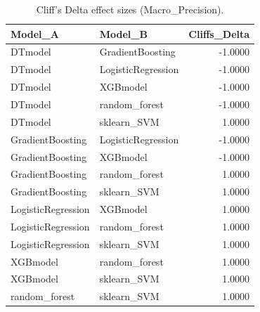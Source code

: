 \begin{table}[t]
\centering
\begin{tabular}{llr}
\toprule
Model_A & Model_B & Cliffs_Delta \\
\midrule
DTmodel & GradientBoosting & -1.0000 \\
DTmodel & LogisticRegression & -1.0000 \\
DTmodel & XGBmodel & -1.0000 \\
DTmodel & random_forest & -1.0000 \\
DTmodel & sklearn_SVM & 1.0000 \\
GradientBoosting & LogisticRegression & -1.0000 \\
GradientBoosting & XGBmodel & -1.0000 \\
GradientBoosting & random_forest & 1.0000 \\
GradientBoosting & sklearn_SVM & 1.0000 \\
LogisticRegression & XGBmodel & 1.0000 \\
LogisticRegression & random_forest & 1.0000 \\
LogisticRegression & sklearn_SVM & 1.0000 \\
XGBmodel & random_forest & 1.0000 \\
XGBmodel & sklearn_SVM & 1.0000 \\
random_forest & sklearn_SVM & 1.0000 \\
\bottomrule
\end{tabular}
\caption{Cliff's Delta effect sizes (Macro_Precision).}
\label{tab:cliffs_Macro_Precision}
\end{table}